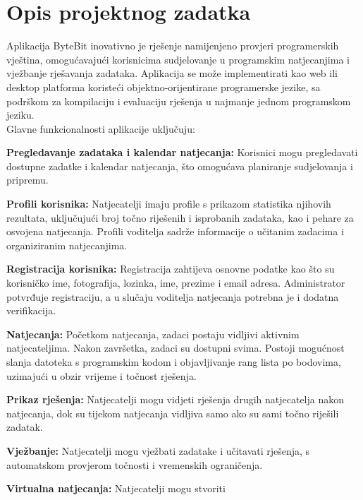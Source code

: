 \chapter{Opis projektnog zadatka}
		
		
		
		Aplikacija ByteBit inovativno je rješenje namijenjeno provjeri 
		programerskih vještina, omogućavajući korisnicima sudjelovanje u 
		programskim natjecanjima i vježbanje rješavanja zadataka. Aplikacija 
		se može implementirati kao web ili desktop platforma koristeći 
		objektno-orijentirane programerske jezike, sa podrškom za kompilaciju
		i evaluaciju rješenja u najmanje jednom programskom jeziku.\\

		Glavne funkcionalnosti aplikacije uključuju:
		\begin{packed_item}
    	\item \textbf{Pregledavanje zadataka i kalendar natjecanja:} 
		Korisnici mogu pregledavati dostupne zadatke i kalendar natjecanja, 
		što omogućava planiranje sudjelovanja i pripremu.
    	\item \textbf{Profili korisnika:} Natjecatelji imaju profile s 
		prikazom statistika njihovih rezultata, uključujući broj točno 
		riješenih i isprobanih zadataka, kao i pehare za osvojena natjecanja.
		Profili voditelja sadrže informacije o učitanim zadacima i 
		organiziranim natjecanjima.
 		\item \textbf{Registracija korisnika:} Registracija zahtijeva 
		osnovne podatke kao što su korisničko ime, fotografija, lozinka, 
		ime, prezime i email adresa. Administrator potvrđuje registraciju,
		a u slučaju voditelja natjecanja potrebna je i dodatna verifikacija.
    	\item \textbf{Natjecanja:} Početkom natjecanja, zadaci postaju 
		vidljivi aktivnim natjecateljima. Nakon završetka, zadaci su
		dostupni svima. Postoji mogućnost slanja datoteka s programskim
		kodom i objavljivanje rang lista po bodovima, uzimajući u
		obzir vrijeme i točnost rješenja.
    	\item \textbf{Prikaz rješenja:} Natjecatelji mogu vidjeti 
		rješenja drugih natjecatelja nakon natjecanja, dok su tijekom 
		natjecanja vidljiva samo ako su sami točno riješili zadatak.
    	\item \textbf{Vježbanje:} Natjecatelji mogu vježbati zadatake i 
		učitavati rješenja, s automatskom provjerom točnosti i vremenskih ograničenja.
   		\item \textbf{Virtualna natjecanja:} Natjecatelji mogu stvoriti 

\end{packed_item}
